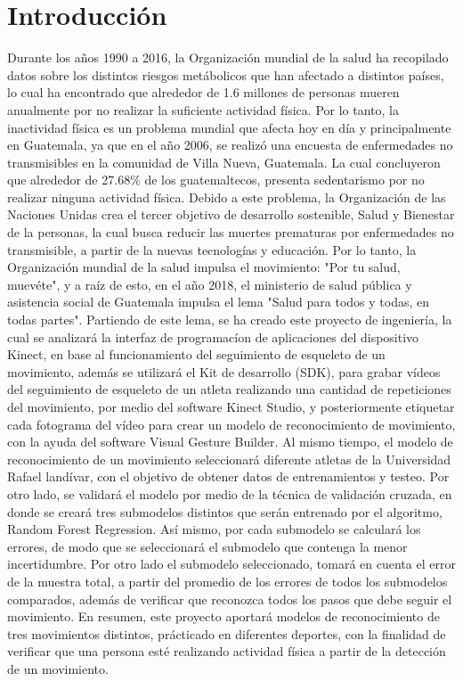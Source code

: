 \chapter{Introducci\'on}
Durante los a\~nos 1990 a 2016, la Organizaci\'on mundial de la salud ha recopilado datos sobre los distintos riesgos met\'abolicos que han afectado a distintos pa\'ises, lo cual ha encontrado que alrededor de 1.6 millones de personas mueren anualmente por no realizar la suficiente actividad f\'isica. Por lo tanto, la inactividad f\'isica es un problema mundial que afecta hoy en d\'ia y principalmente en Guatemala, ya que en el a\~no 2006, se realiz\'o una encuesta de enfermedades no transmisibles en la comunidad de Villa Nueva, Guatemala. La cual concluyeron que alrededor de 27.68\% de los guatemaltecos, presenta sedentarismo por no realizar ninguna actividad f\'isica.
\medbreak
Debido a este problema, la Organizaci\'on de las Naciones Unidas crea el tercer objetivo de desarrollo sostenible, Salud y Bienestar de la personas, la cual busca reducir las muertes prematuras por enfermedades no transmisible, a partir de la nuevas tecnolog\'ias y educaci\'on. Por lo tanto, la Organizaci\'on mundial de la salud impulsa el movimiento: "Por tu salud, muev\'ete", y a ra\'iz de esto, en el a\~no 2018, el ministerio de salud p\'ublica y asistencia social de Guatemala impulsa el lema "Salud para todos y todas, en todas partes".
\medbreak
Partiendo de este lema, se ha creado este proyecto de ingenier\'ia, la cual se analizar\'a la interfaz de programac\'ion de aplicaciones del dispositivo Kinect, en base al funcionamiento del seguimiento de esqueleto de un movimiento, adem\'as se utilizar\'a el Kit de desarrollo (SDK), para grabar v\'ideos del seguimiento de esqueleto de un atleta realizando una cantidad de repeticiones del movimiento, por medio del software Kinect Studio, y posteriormente etiquetar cada fotograma del v\'ideo para crear un modelo de reconocimiento de movimiento, con la ayuda del software Visual Gesture Builder.
\medbreak
Al mismo tiempo, el modelo de reconocimiento de un movimiento seleccionar\'a diferente atletas de la Universidad Rafael land\'ivar, con el objetivo de obtener datos de entrenamientos y testeo. Por otro lado, se validar\'a el modelo por medio de la t\'ecnica de validaci\'on cruzada, en donde se crear\'a tres submodelos distintos que ser\'an entrenado por el algoritmo, Random Forest Regression. As\'i mismo, por cada submodelo se calcular\'a los errores, de modo que se seleccionar\'a el submodelo que contenga la menor incertidumbre.
\medbreak
Por otro lado el submodelo seleccionado, tomar\'a en cuenta el error de la muestra total, a partir del promedio de los errores de todos los submodelos comparados, adem\'as de verificar que reconozca todos los pasos que debe seguir el movimiento.
\medbreak
En resumen, este proyecto aportar\'a modelos de reconocimiento de tres movimientos distintos, pr\'acticado en diferentes deportes, con la finalidad de verificar que una persona est\'e realizando actividad f\'isica a partir de la detecci\'on de un movimiento.

